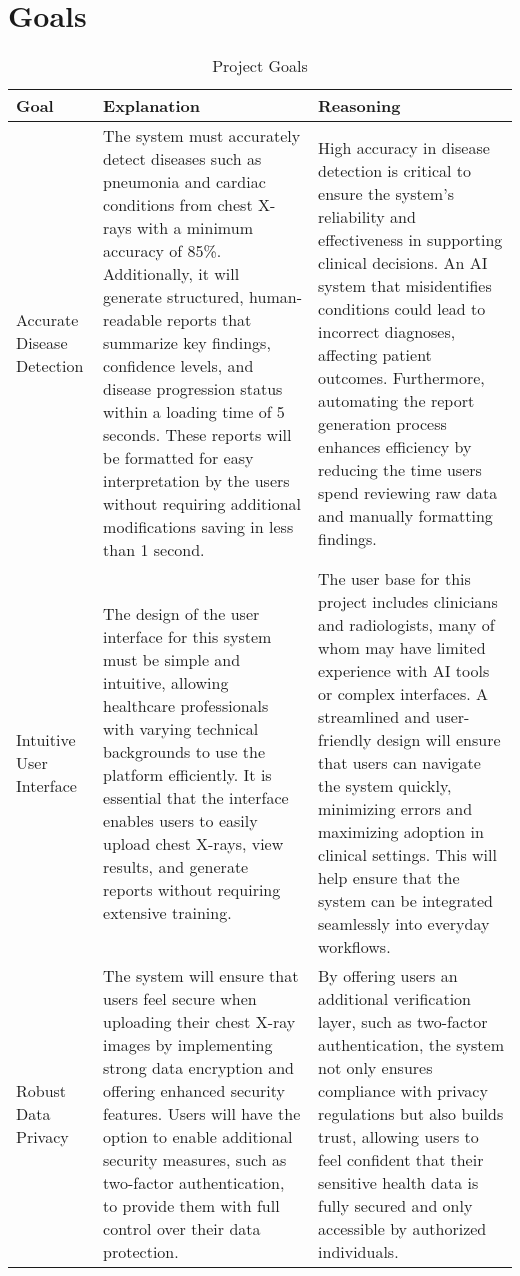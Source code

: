 \documentclass{article}
\begin{document}
\section{Goals}
\begin{table}[H] %
    \hspace*{-2cm}
    \centering
    \begin{tabular}{|p{3cm}|p{6cm}|p{6cm}|}
    \hline
    \textbf{Goal} & \textbf{Explanation} & \textbf{Reasoning} \\ \hline
    Accurate Disease Detection & The system must accurately detect diseases such as pneumonia and cardiac conditions from chest X-rays with a minimum accuracy of 85\%. Additionally, it will generate structured, human-readable reports that summarize key findings, confidence levels, and disease progression status within a loading time of 5 seconds. These reports will be formatted for easy interpretation by the users without requiring additional modifications saving in less than 1 second. & High accuracy in disease detection is critical to ensure the system’s reliability and effectiveness in supporting clinical decisions. An AI system that misidentifies conditions could lead to incorrect diagnoses, affecting patient outcomes. Furthermore, automating the report generation process enhances efficiency by reducing the time users spend reviewing raw data and manually formatting findings. \\ \hline

    Intuitive User Interface & The design of the user interface for this system must be simple and intuitive, allowing healthcare professionals with varying technical backgrounds to use the platform efficiently. It is essential that the interface enables users to easily upload chest X-rays, view results, and generate reports without requiring extensive training. &The user base for this project includes clinicians and radiologists, many of whom may have limited experience with AI tools or complex interfaces. A streamlined and user-friendly design will ensure that users can navigate the system quickly, minimizing errors and maximizing adoption in clinical settings. This will help ensure that the system can be integrated seamlessly into everyday workflows.  \\ \hline
    
    Robust Data Privacy  & The system will ensure that users feel secure when uploading their chest X-ray images by implementing strong data encryption and offering enhanced security features. Users will have the option to enable additional security measures, such as two-factor authentication, to provide them with full control over their data protection. & By offering users an additional verification layer, such as two-factor authentication, the system not only ensures compliance with privacy regulations but also builds trust, allowing users to feel confident that their sensitive health data is fully secured and only accessible by authorized individuals. \\ \hline
    \end{tabular}
    \caption{Project Goals}
\end{table}
\end{document}
